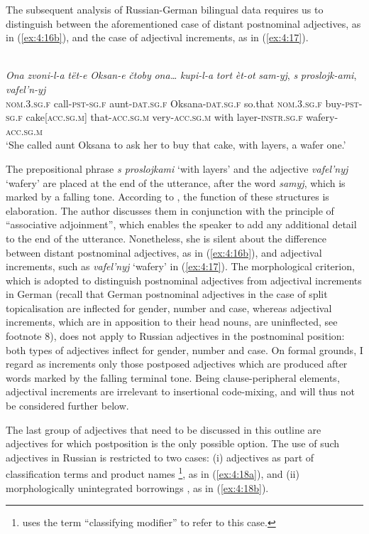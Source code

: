 The subsequent analysis of Russian-German bilingual data requires us to distinguish between the aforementioned case of distant postnominal adjectives, as in (\ref{ex:4:16b}), and the case of adjectival increments, as in (\ref{ex:4:17}).

\ea
\label{ex:4:17}
\citep[155]{zemskaja}\\
\gll \textit{Ona} \textit{zvoni-l-a} \textit{tët-e} \textit{Oksan-e}  \textit{čtoby} \textit{ona\dots} \textit{kupi-l-a} \textit{tort} \textit{èt-ot} \textit{sam-yj}, \textit{s} \textit{proslojk-ami}, \textit{vafel'n-yj}\\
	\textsc{nom.3.sg.f} call-\textsc{pst-sg.f} aunt-\textsc{dat.sg.f} Oksana-\textsc{dat.sg.f} so.that \textsc{nom.3.sg.f} buy-\textsc{pst-sg.f} cake[\textsc{acc.sg.m}] that-\textsc{acc.sg.m} very-\textsc{acc.sg.m} with layer-\textsc{instr.sg.f} wafery-\textsc{acc.sg.m}\\
\glt `She called aunt Oksana to ask her to buy that cake, with layers, a wafer one.'
\z

\noindent The prepositional phrase \textit{s proslojkami} `with layers' and the adjective \textit{vafel'nyj} `wafery' are placed at the end of the utterance, after the word \textit{samyj}, which is marked by a falling tone. According to \citet[155-156]{zemskaja}, the function of these structures is elaboration. The author discusses them in conjunction with the principle of ``associative adjoinment'', which enables the speaker to add any additional detail to the end of the utterance. Nonetheless, she is silent about the difference between distant postnominal adjectives, as in (\ref{ex:4:16b}), and adjectival increments, such as \textit{vafel'nyj} `wafery' in (\ref{ex:4:17}). The morphological criterion, which is adopted to distinguish postnominal adjectives from adjectival increments in German (recall that German postnominal adjectives in the case of split topicalisation are inflected for gender, number and case, whereas adjectival increments, which are in apposition to their head nouns, are uninflected, see footnote 8), does not apply to Russian adjectives in the postnominal position: both types of adjectives inflect for gender, number and case. On formal grounds, I regard as increments only those postposed adjectives which are produced after words marked by the falling terminal tone. Being clause-peripheral elements, adjectival increments are irrelevant to insertional code-mixing, and will thus not be considered further below. 

The last group of adjectives that need to be discussed in this outline are adjectives for which postposition is the only possible option. The use of such adjectives in Russian is restricted to two cases: (i) adjectives as part of classification terms and product names \citep[203]{rusgramm-tom2}\footnote{\citet{rijkhoff} uses the term ``classifying modifier'' to refer to this case.}, as in (\ref{ex:4:18a}), and (ii) morphologically unintegrated borrowings \citep[556]{rusgramm-tom1}, as in (\ref{ex:4:18b}). 

